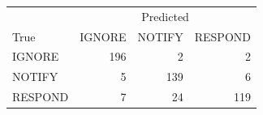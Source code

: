 \begin{tabular}{lrrr}
\toprule
 & \multicolumn{3}{c}{Predicted} \\
True & IGNORE & NOTIFY & RESPOND \\
\midrule
IGNORE & 196 & 2 & 2 \\
NOTIFY & 5 & 139 & 6 \\
RESPOND & 7 & 24 & 119 \\
\bottomrule
\end{tabular}

